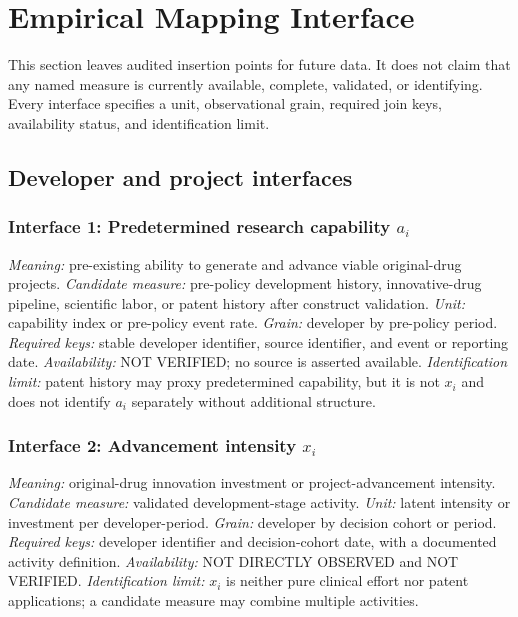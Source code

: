 \section{Empirical Mapping Interface}
\label{sec:p10-mapping}

This section leaves audited insertion points for future data. It does not
claim that any named measure is currently available, complete, validated, or
identifying. Every interface specifies a unit, observational grain, required
join keys, availability status, and identification limit.

\subsection{Developer and project interfaces}
\label{subsec:p10-developer-project}

\subsubsection{Interface 1: Predetermined research capability \texorpdfstring{\(a_i\)}{a(i)}}
\textit{Meaning:} pre-existing ability to generate and advance viable
original-drug projects.
\textit{Candidate measure:} pre-policy development history, innovative-drug
pipeline, scientific labor, or patent history after construct validation.
\textit{Unit:} capability index or pre-policy event rate.
\textit{Grain:} developer by pre-policy period.
\textit{Required keys:} stable developer identifier, source identifier, and
event or reporting date.
\textit{Availability:} NOT VERIFIED; no source is asserted available.
\textit{Identification limit:} patent history may proxy predetermined
capability, but it is not \(x_i\) and does not identify \(a_i\) separately
without additional structure.

\subsubsection{Interface 2: Advancement intensity \texorpdfstring{\(x_i\)}{x(i)}}
\textit{Meaning:} original-drug innovation investment or
project-advancement intensity.
\textit{Candidate measure:} validated development-stage activity.
\textit{Unit:} latent intensity or investment per developer-period.
\textit{Grain:} developer by decision cohort or period.
\textit{Required keys:} developer identifier and decision-cohort date, with a
documented activity definition.
\textit{Availability:} NOT DIRECTLY OBSERVED and NOT VERIFIED.
\textit{Identification limit:} \(x_i\) is neither pure clinical effort nor
patent applications; a candidate measure may combine multiple activities.

